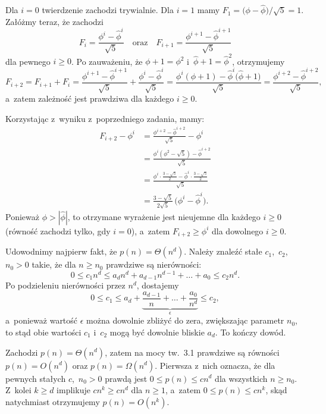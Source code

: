 \exercise %
Dla $i=0$ twierdzenie zachodzi trywialnie. Dla $i=1$ mamy $F_1=\bigl(\phi-\widehat\phi\bigr)/\sqrt{5}=1$. Załóżmy teraz, że zachodzi
\[
	F_i = \frac{\phi^i-\widehat\phi^i}{\sqrt{5}} \quad\text{oraz}\quad F_{i+1} = \frac{\phi^{i+1}-\widehat\phi^{i+1}}{\sqrt{5}}
\]
dla pewnego $i\ge0$. Po zauważeniu, że $\phi+1=\phi^2$ i~$\widehat\phi+1=\widehat\phi^2$, otrzymujemy
\[
	F_{i+2} = F_{i+1}+F_i = \frac{\phi^{i+1}-\widehat\phi^{i+1}}{\sqrt{5}}+\frac{\phi^i-\widehat\phi^i}{\sqrt{5}} = \frac{\phi^i(\phi+1)-\widehat\phi^i\bigl(\widehat\phi+1\bigr)}{\sqrt{5}} = \frac{\phi^{i+2}-\widehat\phi^{i+2}}{\sqrt{5}},
\]
a~zatem zależność jest prawdziwa dla każdego $i\ge0$.

\exercise %
Korzystając z~wyniku z~poprzedniego zadania, mamy:
\begin{align*}
    F_{i+2}-\phi^i &= \frac{\phi^{i+2}-\widehat\phi^{i+2}}{\sqrt{5}}-\phi^i \\[1mm]
	&= \frac{\phi^i(\phi^2-\sqrt{5})-\widehat\phi^{i+2}}{\sqrt{5}} \\[1mm]
	&= \frac{\phi^i\cdot\frac{3-\sqrt{5}}{2}-\widehat\phi^i\cdot\frac{3-\sqrt{5}}{2}}{\sqrt{5}} \\
	&= \frac{3-\sqrt{5}}{2\sqrt{5}}\,\bigl(\phi^i-\widehat\phi^i\bigr).
\end{align*}
Ponieważ $\phi>|\widehat\phi|$, to otrzymane wyrażenie jest nieujemne dla każdego $i\ge0$ (równość zachodzi tylko, gdy $i=0$), a~zatem $F_{i+2}\ge\phi^i$ dla dowolnego $i\ge0$.

\problems

Udowodnimy najpierw fakt, że $p(n)=\Theta(n^d)$. Należy znaleźć stałe $c_1$,~$c_2$,~$n_0>0$ takie, że dla $n\ge n_0$ prawdziwe są nierówności:
\[
	0 \le c_1n^d \le a_dn^d+a_{d-1}n^{d-1}+\dots+a_0 \le c_2n^d.
\]
Po podzieleniu nierówności przez $n^d$, dostajemy
\[
	0 \le c_1 \le a_d+\underbrace{\frac{a_{d-1}}{n}+\dots+\frac{a_0}{n^d}}_\epsilon \le c_2,
\]
a~ponieważ wartość $\epsilon$ można dowolnie zbliżyć do zera, zwiększając parametr $n_0$, to stąd obie wartości $c_1$ i~$c_2$ mogą być dowolnie bliskie $a_d$. To kończy dowód.

\subproblem %
Zachodzi $p(n)=\Theta(n^d)$, zatem na mocy tw.~3.1 prawdziwe są równości $p(n)=O(n^d)$ oraz $p(n)=\Omega(n^d)$. Pierwsza z~nich oznacza, że dla pewnych stałych $c$,~$n_0>0$ prawdą jest $0\le p(n)\le cn^d$ dla wszystkich $n\ge n_0$. Z~kolei $k\ge d$ implikuje $cn^k\ge cn^d$ dla $n\ge1$, a~zatem $0\le p(n)\le cn^k$, skąd natychmiast otrzymujemy $p(n)=O(n^k)$.

